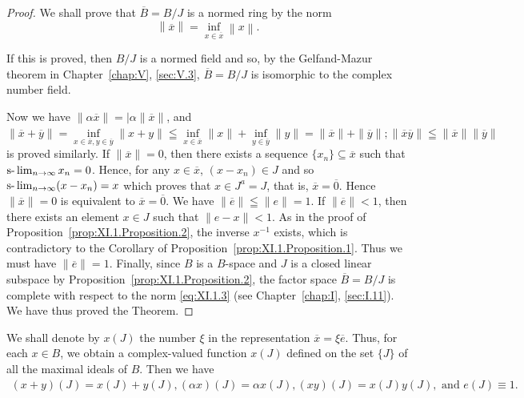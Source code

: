 \begin{proof}
 We shall prove that $\overline{B}=B/J$ is a normed ring by the norm 
\begin{equation}\label{eq:XI.1.3}
\left\| \overline {{x}} \right\| = \inf\limits _ {x \in \overline {{x}}} \left\| x \right\|. \end{equation}

If this is proved, then $B / J$ is a normed field and so, by the Gelfand-Mazur theorem in Chapter~\ref{chap:V}, \ref{sec:V.3}, $\overline{B} = B / J$ is isomorphic to the complex number field. 

Now we have $\|\alpha \overline{x}\| = |\alpha \|\overline{x}\|$, and $\|\overline{x} + \overline{y}\| = \inf\limits_{x \in \overline{x}, y \in \overline{y}} \|x + y\| \leqq \inf\limits_{x \in \overline{x}} \|x\| + \inf\limits_{y \in \overline{y}} \|y\| = \|\overline{x}\| + \|\overline{y}\|; \|\overline{x} \overline{y}\| \leqq \|\overline{x}\| \|\overline{y}\|$ is proved similarly. If $\|\overline{x}\| = 0$, then there exists a sequence $\{x_n\} \subseteq \overline{x}$ such that $\text{s-}\lim\nolimits_{n \to \infty} x_n = 0$. Hence, for any $x \in \overline{x}$, $(x - x_n) \in J$ and so $\text{s-}\lim\nolimits_{n \to \infty} (x - x_n) = x$ which proves that $x \in J^a = J$, that is, $\overline{x} = \overline{0}$. Hence $\|\overline{x}\| = 0$ is equivalent to $\overline{x} = \overline{0}$. We have $\|\overline{e}\| \leqq \|e\| = 1$. If $\|\overline{e}\| < 1$, then there exists an element $x \in J$ such that $\|e - x\| < 1$. As in the proof of Proposition~\ref{prop:XI.1.Proposition.2}, the inverse $x^{-1}$ exists, which is contradictory to the Corollary of Proposition~\ref{prop:XI.1.Proposition.1}. Thus we must have $\|\overline{e}\| = 1$. Finally, since $B$ is a $B$-space and $J$ is a closed linear subspace by Proposition~\ref{prop:XI.1.Proposition.2}, the factor space $\overline{B} = B / J$ is complete with respect to the norm \eqref{eq:XI.1.3} (see Chapter~\ref{chap:I}, \ref{sec:I.11}). We have thus proved the Theorem. 
\end{proof}

\begin{corollaryu} We shall denote by $x(J)$ the number $\xi$ in the representation $\overline{x} = \xi \overline{e}$. Thus, for each $x \in B$, we obtain a complex-valued function $x(J)$ defined on the set $\{J\}$ of all the maximal ideals of $B$. Then we have 
\begin{equation}\label{eq:XI.1.4}
\begin{gathered}
(x + y) (J) = x (J) + y (J), (\alpha x) (J) = \alpha x (J), (x y) (J) = x (J) y (J), \text{ and } e (J) \equiv 1.
\end{gathered}
\end{equation}
\end{corollaryu}


